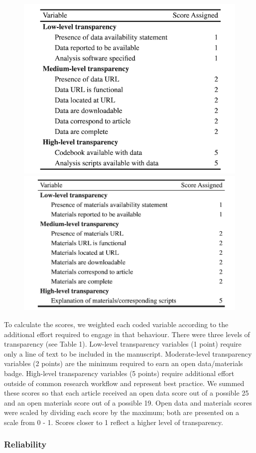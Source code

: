 \documentclass[
  english,
  man,floatsintext]{apa6}
\begin{document}
\begin{figure}

{\centering \includegraphics[width=0.49\linewidth,height=0.2\textheight]{data_scoring} \includegraphics[width=0.49\linewidth,height=0.2\textheight]{mat_scoring} 

}

\end{figure}

To calculate the scores, we weighted each coded variable according to the additional effort required to engage in that behaviour. There were three levels of transparency (see Table 1). Low-level transparency variables (1 point) require only a line of text to be included in the manuscript. Moderate-level transparency variables (2 points) are the minimum required to earn an open data/materials badge. High-level transparency variables (5 points) require additional effort outside of common research workflow and represent best practice. We summed these scores so that each article received an open data score out of a possible 25 and an open materials score out of a possible 19. Open data and materials scores were scaled by dividing each score by the maximum; both are presented on a scale from 0 - 1. Scores closer to 1 reflect a higher level of transparency.

\hypertarget{reliability}{%
\subsubsection{Reliability}\label{reliability}}
\end{document}
